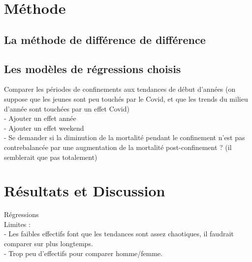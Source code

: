 \documentclass{article}
\begin{document}
\section{Méthode}

\subsection{La méthode de différence de différence}


\subsection{Les modèles de régressions choisis}

Comparer les périodes de confinements aux tendances de début d'années (on suppose que les jeunes sont peu touchés par le Covid, et que les trends du milieu d'année sont touchées par un effet Covid)\\

- Ajouter un effet année \\

- Ajouter un effet weekend \\

- Se demander si la diminution de la mortalité pendant le confinement n'est pas contrebalancée par une augmentation de la mortalité post-confinement ? (il semblerait que pas totalement)\\





\section{Résultats et Discussion}

Régressions \\


Limites : \\

- Les faibles effectifs font que les tendances sont assez chaotiques, il faudrait comparer sur plus longtemps. \\

- Trop peu d'effectifs pour comparer homme/femme. \\
\end{document}
